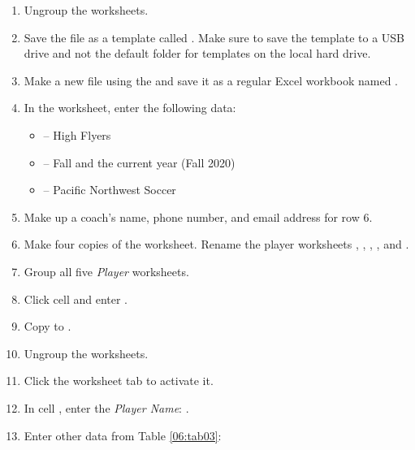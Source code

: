 \begin{enumerate}
	\item Ungroup the worksheets.
	\item Save the file as a template called . Make sure to save the  template to a USB drive and not the default folder for templates on the local hard drive.
	\item Make a new file using the  and save it as a regular Excel workbook named . 
	\item In the  worksheet, enter the following data:
	
	\begin{itemize}
		\item {} – High Flyers
		\item {} – Fall and the current year (\ie Fall 2020)
		\item {} – Pacific Northwest Soccer
	\end{itemize}
	
	\item Make up a coach's name, phone number, and email address for row $ 6 $.
	\item Make four copies of the  worksheet. Rename the player worksheets , , , , and .
	\item Group all five \textit{Player} worksheets.
	\item Click cell  and enter .
	\item Copy  to .
	\item Ungroup the worksheets.
	\item Click the  worksheet tab to activate it. 
	\item In cell , enter the \textit{Player Name}: . 
	\item Enter other data from Table \ref{06:tab03}:
\end{enumerate}

